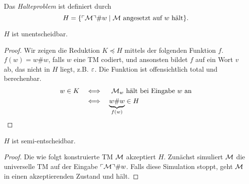 \begin{Def}[name={[Halteproblem]}]
	Das \emph{Halteproblem} ist definiert durch
	\[H = \{\ulcorner \mathcal{M} \urcorner\# w \mid \mathcal{M} \text{ angesetzt auf } w \text{ hält}\}. \qedhere\]
\end{Def}
\begin{Satz}[name={[$H$ ist unentscheidbar]}]\label{satz:H ist unentscheidbar}
	$H$ ist unentscheidbar.
\end{Satz}
\begin{proof}
  Wir zeigen die Reduktion $K \preceq H$ mittels der folgenden Funktion $f$.
  $f(w) = w\#w$, falls $w$ eine \ac{TM} codiert, und ansonsten bildet $f$ auf ein Wort $v$ ab, das nicht in $H$ liegt, z.B. $\varepsilon$.
  Die Funktion ist offensichtlich total und berechenbar.
  \begin{align*}
   w \in K & \quad\Longleftrightarrow\quad \text{ $\mathcal{M}_w$ hält bei Eingabe $w$ an}\\
   & \quad\Longleftrightarrow\quad \underbrace{w\#w}_{f(w)} \in H \qedhere
  \end{align*}
\end{proof}
\begin{Satz}[name={[$H$ ist semi-entscheidbar]}]\label{satz:H-semi-entscheidbar}
	$H$ ist semi-entscheidbar.
\end{Satz}
\begin{proof}
  Die wie folgt konstruierte \ac{TM} $\mathcal{M}$ akzeptiert $H$.
  Zunächst simuliert $\mathcal{M}$ die universelle \ac{TM} auf der Eingabe $\ulcorner \mathcal{M} \urcorner\#w$.
  Falls diese Simulation stoppt, geht $\mathcal{M}$ in einen akzeptierenden Zustand und hält.
\end{proof}


